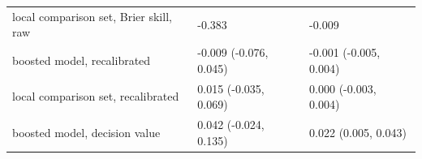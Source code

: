 \begin{tabular}{lll}
local comparison set, Brier skill, raw & -0.383 & -0.009 \\
boosted model, recalibrated & -0.009 (-0.076, 0.045) & -0.001 (-0.005, 0.004) \\
local comparison set, recalibrated & 0.015 (-0.035, 0.069) & 0.000 (-0.003, 0.004) \\
boosted model, decision value & 0.042 (-0.024, 0.135) & 0.022 (0.005, 0.043) \\

\end{tabular}
